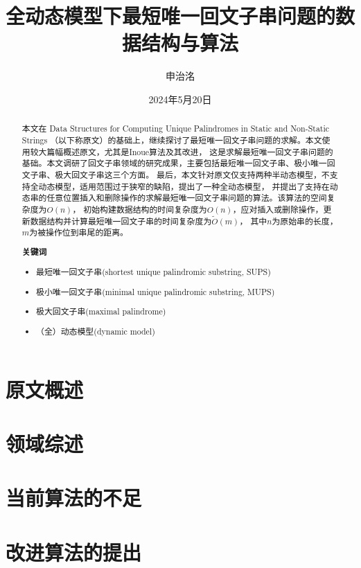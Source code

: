 \documentclass{ctexart}
\title{全动态模型下最短唯一回文子串问题的数据结构与算法}
\author{申治洺}
\date{2024年5月20日}
\begin{document}
    \maketitle

    \begin{abstract}
        本文在 Data Structures for Computing Unique Palindromes in Static and Non-Static Strings\cite{Mieno2024}
        （以下称原文）的基础上，继续探讨了最短唯一回文子串问题的求解。本文使用较大篇幅概述原文，尤其是Inoue算法\cite{Inoue2018}及其改进，
        这是求解最短唯一回文子串问题的基础。本文调研了回文子串领域的研究成果，主要包括最短唯一回文子串、极小唯一回文子串、极大回文子串这三个方面。
        最后，本文针对原文仅支持两种半动态模型，不支持全动态模型，适用范围过于狭窄的缺陷，提出了一种全动态模型，
        并提出了支持在动态串的任意位置插入和删除操作的求解最短唯一回文子串问题的算法。该算法的空间复杂度为$O(n)$，
        初始构建数据结构的时间复杂度为$O(n)$，应对插入或删除操作，更新数据结构并计算最短唯一回文子串的时间复杂度为$\tilde{O}(m)$，
        其中$n$为原始串的长度，$m$为被操作位到串尾的距离。

        \textbf{关键词}
        \begin{itemize}
            \item 最短唯一回文子串(shortest unique palindromic substring, SUPS)
            \item 极小唯一回文子串(minimal unique palindromic substring, MUPS)
            \item 极大回文子串(maximal palindrome)
            \item （全）动态模型(dynamic model)
        \end{itemize}
    \end{abstract}
    
    \section{原文概述}\label{sec:1}
    

    \section{领域综述}\label{sec:2}
    

    \section{当前算法的不足}\label{sec:3}
    

    \section{改进算法的提出}\label{sec:4}
    

    
    
\end{document}
